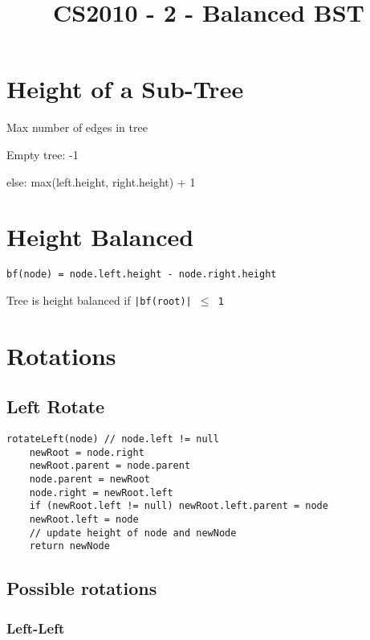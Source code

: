 \documentclass[12pt]{article}
\title{\textbf{CS2010 - 2 - Balanced BST}}
\date{}
\begin{document}
\maketitle

\begin{spacing}{1.5}

\section{Height of a Sub-Tree}

Max number of edges in tree

\begin{itemize*}
	\item Empty tree: -1
	\item else: max(left.height, right.height) + 1
\end{itemize*}

\section{Height Balanced}

\texttt{bf(node) = node.left.height - node.right.height}

Tree is height balanced if \texttt{|bf(root)| $\le$ 1}

\section{Rotations}

\subsection{Left Rotate}

\begin{verbatim}
rotateLeft(node) // node.left != null
    newRoot = node.right
    newRoot.parent = node.parent
    node.parent = newRoot
    node.right = newRoot.left
    if (newRoot.left != null) newRoot.left.parent = node
    newRoot.left = node
    // update height of node and newNode
    return newNode
\end{verbatim}

\subsection{Possible rotations}

\subsubsection{Left-Left}


\end{spacing}
\end{document}
